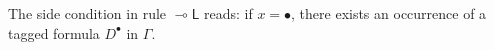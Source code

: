 \documentclass[submission,copyright,creativecommons]{eptcs}
\theoremstyle{definition}
\newcommand{\lleft}{{\multimap}\mathsf{L}}
\newcommand{\RI}{\mathsf{RI}}
\newcommand{\Pass}{\mathsf{P}}
\newcommand{\F}{\mathsf{F}}
\begin{document}
The side condition in rule $\lleft$ reads: if $x = \bullet$, there exists an occurrence of a tagged formula $D^\bullet$ in $\Gamma$.

\end{document}
